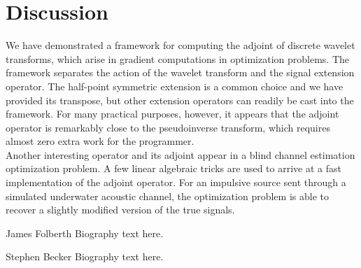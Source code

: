 \documentclass[journal]{IEEEtran}
\begin{document}


\section{Discussion}
We have demonstrated a framework for computing the adjoint of discrete wavelet transforms, which arise in gradient computations in optimization problems.  The framework separates the action of the wavelet transform and the signal extension operator.  The half-point symmetric extension is a common choice and we have provided its transpose, but other extension operators can readily be cast into the framework.  For many practical purposes, however, it appears that the adjoint operator is remarkably close to the pseudoinverse transform, which requires almost zero extra work for the programmer.\\

Another interesting operator and its adjoint appear in a blind channel estimation optimization problem.  A few linear algebraic tricks are used to arrive at a fast implementation of the adjoint operator.  For an impulsive source sent through a simulated underwater acoustic channel, the optimization problem is able to recover a slightly modified version of the true signals.\\





\begin{IEEEbiographynophoto}{James Folberth}
Biography text here.
\end{IEEEbiographynophoto}

\begin{IEEEbiographynophoto}{Stephen Becker}
Biography text here.
\end{IEEEbiographynophoto}
\end{document}
